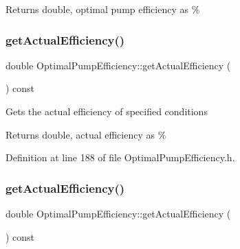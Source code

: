 \begin{DoxyReturn}{Returns}
double, optimal pump efficiency as \% 
\end{DoxyReturn}
\mbox{\label{class_optimal_pump_efficiency_aa2ac8a7c61bc28f82e30cb44b9c21008}} 
\subsubsection{\texorpdfstring{get\+Actual\+Efficiency()}{getActualEfficiency()}\hspace{0.1cm}{\footnotesize\ttfamily [1/3]}}
{\footnotesize\ttfamily double Optimal\+Pump\+Efficiency\+::get\+Actual\+Efficiency (\begin{DoxyParamCaption}{ }\end{DoxyParamCaption}) const\hspace{0.3cm}{\ttfamily [inline]}}

Gets the actual efficiency of specified conditions

\begin{DoxyReturn}{Returns}
double, actual efficiency as \% 
\end{DoxyReturn}


Definition at line 188 of file Optimal\+Pump\+Efficiency.\+h.

\mbox{\label{class_optimal_pump_efficiency_aa2ac8a7c61bc28f82e30cb44b9c21008}} 
\subsubsection{\texorpdfstring{get\+Actual\+Efficiency()}{getActualEfficiency()}\hspace{0.1cm}{\footnotesize\ttfamily [2/3]}}
{\footnotesize\ttfamily double Optimal\+Pump\+Efficiency\+::get\+Actual\+Efficiency (\begin{DoxyParamCaption}{ }\end{DoxyParamCaption}) const\hspace{0.3cm}{\ttfamily [inline]}}

